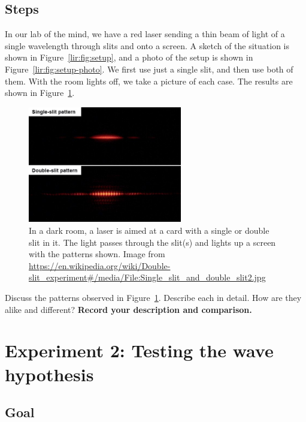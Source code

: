\subsection{Steps}

In our lab of the mind, we have a red laser sending a thin beam of light of a single wavelength through slits and onto a screen. A sketch of the situation is shown in Figure\ \ref{lir:fig:setup}, and a photo of the setup is shown in Figure\ \ref{lir:fig:setup-photo}. We first use just a single slit, and then use both of them. With the room lights off, we take a picture of each case. The results are shown in Figure\ \ref{lir:fig:patterns}.

\begin{figure}
	\centering
	\includegraphics[width=0.6\textwidth]{laser-interference-remote/Single_slit_and_double_slit2.jpg}
	\caption{In a dark room, a laser is aimed at a card with a single or double slit in it. The light passes through the slit(s) and lights up a screen with the patterns shown. Image from \url{https://en.wikipedia.org/wiki/Double-slit_experiment\#/media/File:Single_slit_and_double_slit2.jpg}}\label{lir:fig:patterns}
\end{figure}

\begin{steps}
	\item Discuss the patterns observed in Figure\ \ref{lir:fig:patterns}. Describe each in detail. How are they alike and different? \textbf{Record your description and comparison.}
\end{steps}

\section{Experiment 2: Testing the wave hypothesis}\label{lir:sec:exp2}

\subsection{Goal}

